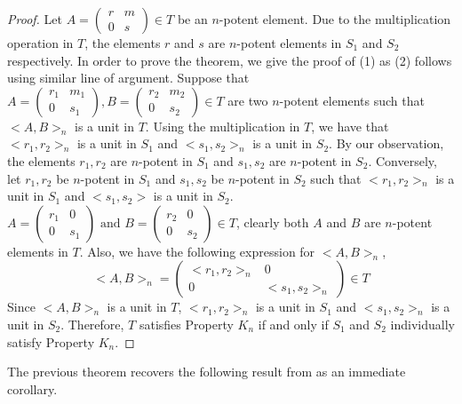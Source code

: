 \documentclass[12pt]{amsart}
\theoremstyle{definition}
\numberwithin{equation}{section}
\begin{document}
 \begin{proof}
     Let $A=\begin{pmatrix}
         r&m\\
         0&s
     \end{pmatrix} \in T$ be an $n$-potent element. Due to the multiplication operation in $T$, the elements $r$ and $s$ are $n$-potent elements in $S_1$ and $S_2$ respectively. In order to prove the theorem, we give the proof of (1) as (2) follows using similar line of argument. Suppose that $A=\begin{pmatrix}
         r_1 & m_1\\
         0 & s_1
     \end{pmatrix}, B=\begin{pmatrix}
         r_2&m_2\\
         0&s_2
     \end{pmatrix} \in T$ are two $n$-potent elements such that $<A,B>_n$ is a unit in $T$. Using the multiplication in $T$, we have that $<r_1,r_2>_n$ is a unit in $S_1$ and $<s_1,s_2>_n$ is a unit in $S_2$. By our observation, the elements $r_1,r_2$ are $n$-potent in $S_1$ and $s_1,s_2$ are $n$-potent in $S_2$.  Conversely, let $r_1,r_2$ be $n$-potent in $S_1$ and $s_1,s_2$ be $n$-potent in $S_2$ such that $<r_1,r_2>_n$ is a unit in $S_1$ and $<s_1,s_2>$ is a unit in $S_2$.  $ A=\begin{pmatrix}
         r_1 & 0\\
         0 & s_1
     \end{pmatrix} \text{ and } B=\begin{pmatrix}
         r_2&0\\
         0&s_2
     \end{pmatrix} \in T$, clearly both $A$ and $B$ are $n$-potent elements in $T$. Also, we have the following expression for $<A,B>_n$,
     $$<A,B>_n=\begin{pmatrix}
         <r_1,r_2>_n &0\\
         0&<s_1,s_2>_n
     \end{pmatrix} \in T$$
Since $<A,B>_n$ is a unit in $T$, $<r_1,r_2>_n$ is a unit in $S_1$ and $<s_1,s_2>_n$ is a unit in $S_2$. Therefore, $T$ satisfies Property $K_n$ if and only if $S_1$ and $S_2$ individually satisfy Property $K_n$. 
 \end{proof}
 The previous theorem recovers the following result from \cite{khurana2018idempotents} as an immediate corollary.
\end{document}
